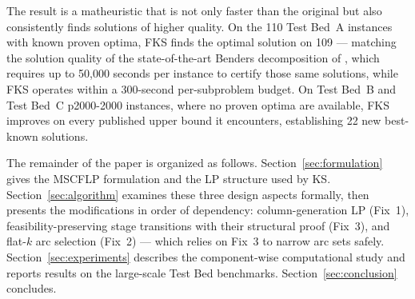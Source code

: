 The result is a matheuristic that is not only faster than the original but
also consistently finds solutions of higher quality.
On the 110 Test Bed~A instances with known proven optima, FKS finds the
optimal solution on 109 --- matching the solution quality of the
state-of-the-art Benders decomposition of \citet{fischetti2016benders}, which
requires up to 50{,}000 seconds per instance to certify those same solutions,
while FKS operates within a 300-second per-subproblem budget.
On Test Bed~B and Test Bed~C p2000-2000 instances, where no proven optima are
available, FKS improves on every published upper bound it encounters,
establishing 22 new best-known solutions.

The remainder of the paper is organized as follows.
Section~\ref{sec:formulation} gives the MSCFLP formulation and the LP structure
used by KS.
Section~\ref{sec:algorithm} examines these three design aspects formally,
then presents the modifications in order of dependency: column-generation LP
(Fix~1), feasibility-preserving stage transitions with their structural proof
(Fix~3), and flat-$k$ arc selection (Fix~2) --- which relies on Fix~3 to
narrow arc sets safely.
Section~\ref{sec:experiments} describes the component-wise computational study
and reports results on the large-scale Test Bed benchmarks.
Section~\ref{sec:conclusion} concludes.
